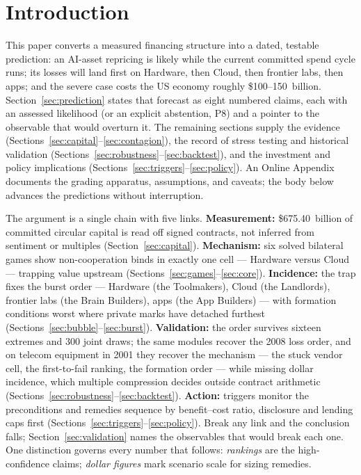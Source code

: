 \documentclass[11pt,a4paper]{article}
\begin{document}
\section{Introduction}
This paper converts a measured financing structure into a dated,
testable prediction: an AI-asset repricing is likely while the current
committed spend cycle runs; its losses will land first on Hardware, then
Cloud, then frontier labs, then apps; and the severe case costs the US
economy roughly \$100--150~billion. Section~\ref{sec:prediction} states
that forecast as eight numbered claims, each with an assessed likelihood
(or an explicit abstention, P8) and a pointer to the observable that would
overturn it. The remaining
sections supply the evidence (Sections~\ref{sec:capital}--\ref{sec:contagion}),
the record of stress testing and historical validation
(Sections~\ref{sec:robustness}--\ref{sec:backtest}), and the investment and
policy implications (Sections~\ref{sec:triggers}--\ref{sec:policy}).
An Online Appendix documents the grading apparatus, assumptions, and
caveats; the body below advances the predictions without interruption.

The argument is a single chain with five links. \textbf{Measurement:}
\$675.40~billion of committed circular capital is read off signed
contracts, not inferred from sentiment or multiples
(Section~\ref{sec:capital}). \textbf{Mechanism:} six solved bilateral games
show non-cooperation binds in exactly one cell --- Hardware versus Cloud ---
trapping value upstream (Sections~\ref{sec:games}--\ref{sec:core}).
\textbf{Incidence:} the trap fixes the burst order --- Hardware (the
Toolmakers), Cloud (the Landlords), frontier labs (the Brain Builders),
apps (the App Builders) --- with formation conditions worst where private marks
have detached furthest (Sections~\ref{sec:bubble}--\ref{sec:burst}).
\textbf{Validation:} the order survives sixteen extremes and 300 joint
draws; the same modules recover the 2008 loss order, and on telecom
equipment in 2001 they recover the mechanism --- the stuck vendor cell,
the first-to-fail ranking, the formation order --- while missing dollar
incidence, which multiple compression decides outside contract arithmetic
(Sections~\ref{sec:robustness}--\ref{sec:backtest}). \textbf{Action:}
triggers monitor the preconditions and remedies sequence by benefit--cost
ratio, disclosure and lending caps first
(Sections~\ref{sec:triggers}--\ref{sec:policy}). Break any link and the
conclusion falls; Section~\ref{sec:validation} names the observables
that would break each one. One distinction governs every number that
follows: \emph{rankings} are the high-confidence claims; \emph{dollar
figures} mark scenario scale for sizing remedies.
\end{document}
